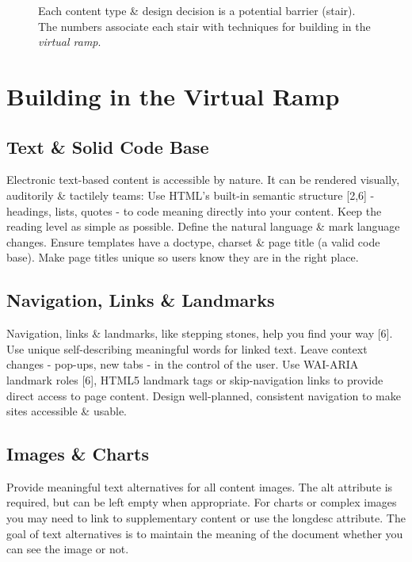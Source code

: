 \documentclass{acm_proc_article-sp}
\begin{document}
\begin{figure*}
\centering
{}
\caption{Each content type \& design decision is a potential barrier (stair). The numbers associate each stair with techniques for building in the \textit{virtual ramp}.}
\end{figure*}

\section{Building in the {\secit Virtual} Ramp}

\subsection{Text \& Solid Code Base}

Electronic text-based content is accessible by nature. It can be rendered visually, auditorily \& tactilely teams: Use HTML's built-in semantic structure [2,6] - headings, lists, quotes - to code meaning directly into your content. Keep the reading level as simple as possible. Define the natural language \& mark language changes. Ensure templates have a doctype, charset \& page title (a valid code base). Make page titles unique so users know they are in the right place.

\subsection{Navigation, Links \& Landmarks}
Navigation, links \& landmarks, like stepping stones, help you find your way [6]. Use unique self-describing meaningful words for linked text. Leave context changes - pop-ups, new tabs - in the control of the user. Use WAI-ARIA landmark roles [6], HTML5 landmark tags or skip-navigation links to provide direct access to page content. Design well-planned, consistent navigation to make sites accessible \& usable.

\subsection{Images \& Charts}
Provide meaningful text alternatives for all content images. The alt attribute is required, but can be left empty when appropriate. For charts or complex images you may need to link to supplementary content or use the longdesc attribute. The goal of text alternatives is to maintain the meaning of the document whether you can see the image or not.
\end{document}
